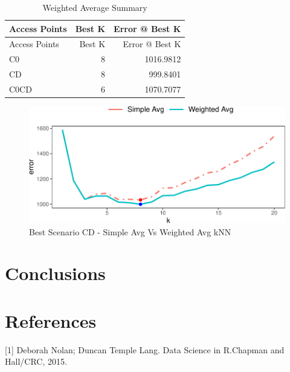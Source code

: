 \documentclass[
]{article}
\begin{document}
\begin{longtable}[]{@{}lrr@{}}
\caption{Weighted Average Summary}\tabularnewline
\toprule
Access Points & Best K & Error @ Best K\tabularnewline
\midrule
\endfirsthead
\toprule
Access Points & Best K & Error @ Best K\tabularnewline
\midrule
\endhead
C0 & 8 & 1016.9812\tabularnewline
CD & 8 & 999.8401\tabularnewline
C0CD & 6 & 1070.7077\tabularnewline
\bottomrule
\end{longtable}

\begin{figure}[H]

{\centering \includegraphics{msds7333_case_study01_files/figure-latex/unnamed-chunk-15-1} 

}

\caption{Best Scenario CD - Simple Avg Vs Weighted Avg kNN}\label{fig:unnamed-chunk-15}
\end{figure}

\hypertarget{conclusions}{%
\section{Conclusions}\label{conclusions}}

\newpage

\hypertarget{references}{%
\section{References}\label{references}}

\leavevmode\hypertarget{refs}{}%
{[}1{]} Deborah Nolan; Duncan Temple Lang. Data Science in R.Chapman and
Hall/CRC, 2015.
\end{document}
